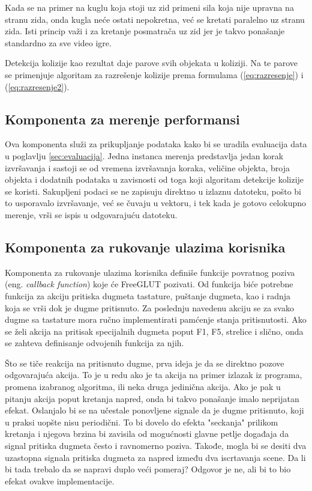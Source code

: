 \documentclass[12pt,oneside]{memoir}
\begin{document}
Kada se na primer na kuglu koja stoji uz zid primeni sila koja nije upravna na stranu zida, onda kugla neće ostati nepokretna,
već se kretati paralelno uz stranu zida. Isti princip važi i za kretanje posmatrača uz zid jer je 
takvo ponašanje standardno za sve video igre.

Detekcija kolizije kao rezultat daje parove svih objekata u koliziji. 
Na te parove se primenjuje algoritam za razrešenje kolizije prema formulama (\ref{eq:razresenje}) i (\ref{eq:razresenje2}).

\subsection{Komponenta za merenje performansi}
\label{sec:perf}

Ova komponenta služi za prikupljanje podataka kako bi se uradila evaluacija data u poglavlju \ref{sec:evaluacija}.
Jedna instanca merenja predstavlja jedan korak izvršavanja i sastoji se od 
vremena izvršavanja koraka, veličine objekta, broja objekta i dodatnih podataka u zavisnosti od toga 
koji algoritam detekcije kolizije se koristi. 
Sakupljeni podaci se ne zapisuju direktno u izlaznu datoteku, pošto bi 
to usporavalo izvršavanje, već se čuvaju u vektoru, 
i tek kada je gotovo celokupno merenje, vrši se ispis u odgovarajuću datoteku.

\subsection{Komponenta za rukovanje ulazima korisnika}

Komponenta za rukovanje ulazima korisnika definiše funkcije povratnog poziva (eng. {\em callback function}) koje će FreeGLUT pozivati.
Od funkcija biće potrebne funkcija za akciju pritiska dugmeta tastature, puštanje dugmeta, kao i 
radnja koja se vrši dok je dugme pritisnuto. 
Za poslednju navedenu akciju se za svako dugme sa tastature mora ručno implementirati pamćenje stanja pritisnutosti.
Ako se želi akcija na pritisak specijalnih dugmeta  
poput F1, F5, strelice i slično, onda se zahteva definisanje odvojenih funkcija za njih.

Što se tiče reakcija na pritisnuto dugme, prva ideja je da se direktno pozove odgovarajuća akcija. 
To je u redu ako je ta akcija na primer izlazak iz programa, promena izabranog algoritma, ili neka druga jedinična akcija.
Ako je pak u pitanju akcija poput kretanja napred, onda bi takvo ponašanje imalo neprijatan efekat. 
Oslanjalo bi se na učestale ponovljene signale da je dugme pritisnuto, koji u praksi uopšte nisu periodični.
To bi dovelo do efekta "seckanja" prilikom kretanja i njegova brzina bi zavisila od mogućnosti glavne petlje događaja da signal pritiska dugmeta često i ravnomerno poziva.
Takođe, mogla bi se desiti  dva uzastopna signala pritiska dugmeta za napred između dva iscrtavanja scene. 
Da li bi tada trebalo da se napravi duplo veći pomeraj? Odgovor je ne, ali bi to bio efekat ovakve implementacije.
\end{document}

